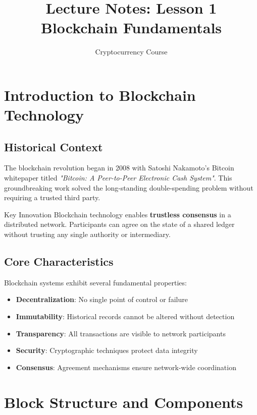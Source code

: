 \documentclass[11pt,a4paper]{article}
\title{\textbf{Lecture Notes: Lesson 1}\\Blockchain Fundamentals}
\author{Cryptocurrency Course}
\date{}
\begin{document}
\maketitle

\tableofcontents
\newpage

\section{Introduction to Blockchain Technology}

\subsection{Historical Context}

The blockchain revolution began in 2008 with Satoshi Nakamoto's Bitcoin whitepaper titled \textit{"Bitcoin: A Peer-to-Peer Electronic Cash System"}. This groundbreaking work solved the long-standing double-spending problem without requiring a trusted third party.

\begin{keybox}{Key Innovation}
Blockchain technology enables \textbf{trustless consensus} in a distributed network. Participants can agree on the state of a shared ledger without trusting any single authority or intermediary.
\end{keybox}

\subsection{Core Characteristics}

Blockchain systems exhibit several fundamental properties:

\begin{itemize}
  \item \textbf{Decentralization}: No single point of control or failure
  \item \textbf{Immutability}: Historical records cannot be altered without detection
  \item \textbf{Transparency}: All transactions are visible to network participants
  \item \textbf{Security}: Cryptographic techniques protect data integrity
  \item \textbf{Consensus}: Agreement mechanisms ensure network-wide coordination
\end{itemize}

\section{Block Structure and Components}
\end{document}
